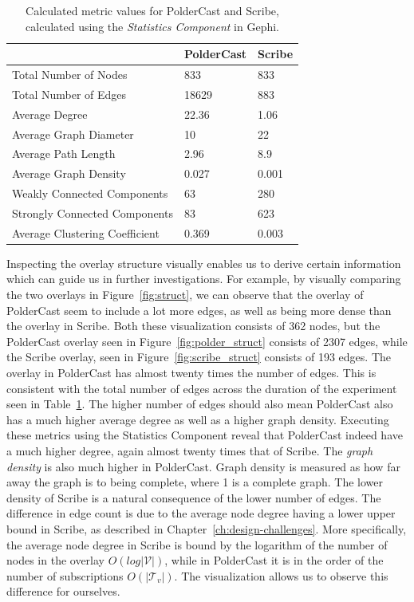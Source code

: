 \begin{table}[h!]
    \centering
    \begin{tabular}{|l | l | l |}
        \hline
        & PolderCast & Scribe \\ \hline
        \hline
        Total Number of Nodes & 833 & 833 \\ \hline
        Total Number of Edges & 18629 & 883 \\ \hline
        Average Degree & 22.36 & 1.06 \\ \hline
        Average Graph Diameter & 10 & 22 \\ \hline
        Average Path Length & 2.96 & 8.9 \\ \hline
        Average Graph Density & 0.027 & 0.001 \\ \hline
        Weakly Connected Components & 63 & 280 \\ \hline
        Strongly Connected Components & 83 & 623 \\ \hline
        Average Clustering Coefficient & 0.369 & 0.003 \\ \hline

    \end{tabular}
    \caption{Calculated metric values for PolderCast and Scribe, calculated using
        the \emph{Statistics Component} in Gephi.}
    \label{tab:struct_metrics}
\end{table}

Inspecting the overlay structure visually enables us to derive certain
information which can guide us in further investigations. For example,
by visually comparing the two overlays in Figure~\ref{fig:struct}, we
can observe that the overlay of PolderCast seem to include a lot more
edges, as well as being more dense than the overlay in Scribe. Both
these visualization consists of 362 nodes, but the PolderCast overlay
seen in Figure~\ref{fig:polder_struct} consists of 2307 edges, while the
Scribe overlay, seen in Figure~\ref{fig:scribe_struct} consists of 193
edges. The overlay in PolderCast has almost twenty times the number of
edges. This is consistent with the total number of edges across the
duration of the experiment seen in Table~\ref{tab:struct_metrics}. The
higher number of edges should also mean PolderCast also has a much
higher average degree as well as a higher graph density. Executing these
metrics using the Statistics Component reveal that PolderCast indeed
have a much higher degree, again almost twenty times that of Scribe. The
\emph{graph density} is also much higher in PolderCast. Graph density is
measured as how far away the graph is to being complete, where 1 is a
complete graph. The lower density of Scribe is a natural consequence of
the lower number of edges. The difference in edge count is due to the
average node degree having a lower upper bound in Scribe, as described
in Chapter~\ref{ch:design-challenges}. More specifically, the average
node degree in Scribe is bound by the logarithm of the number of nodes
in the overlay $O(log |\mathcal V|)$, while in PolderCast it is in the
order of the number of subscriptions $O(|\mathcal T_v|)$. The
visualization allows us to observe this difference for ourselves.

